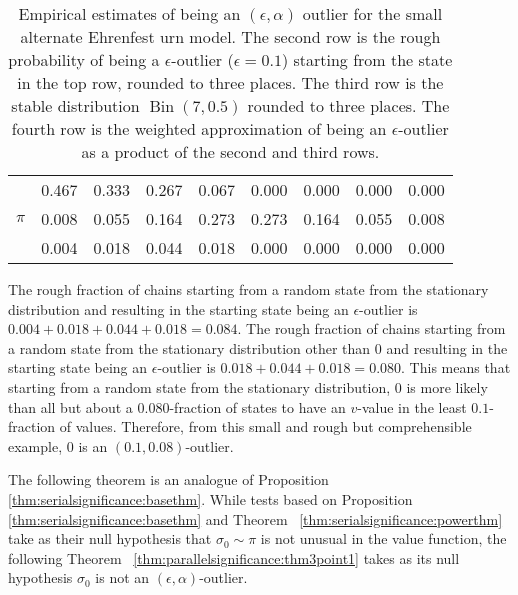 \documentclass[12pt]{article}
\begin{document}
\begin{example}
\begin{table}
\begin{tabular}{l|cccccccc}
                                                    & 0.467 & 0.333 & 0.267 & 0.067 & 0.000  & 0.000 & 0.000 & 0.000 \\ 
            \( \pi \)                               & 0.008 & 0.055 & 0.164 & 0.273 & 0.273  & 0.164 & 0.055 & 0.008 \\ 
                                                    & 0.004 & 0.018 & 0.044 & 0.018 & 0.000  & 0.000 & 0.000 & 0.000 \\ 
        \end{tabular}
        \caption{Empirical estimates of being an \( (\epsilon, \alpha) \)
        outlier for the small alternate Ehrenfest urn model.  The second
        row is the rough probability of being a \( \epsilon \)-outlier (\(
        \epsilon = 0.1 \)) starting from the state in the top row,
        rounded to three places. The third row is the stable
        distribution \(
        \operatorname{Bin}
        (7, 0.5) \) rounded to three places.  The fourth row is the
        weighted approximation of being an \( \epsilon \)-outlier as a
        product of the second and third rows.  }%
        \label{tab:parallelsignificance:epsalpha}
    \end{table}

    The rough fraction of chains starting from a random state from the
    stationary distribution and resulting in the starting state being an
    \( \epsilon \)-outlier is \( 0.004 + 0.018 + 0.044 + 0.018 = 0.084 \).
    The rough fraction of chains starting from a random state from the
    stationary distribution other than \( 0 \) and resulting in the
    starting state being an \( \epsilon \)-outlier is \( 0.018 + 0.044 +
    0.018 = 0.080 \).  This means that starting from a random state from
    the stationary distribution, \( 0 \) is more likely than all but
    about a \( 0.080 \)-fraction of states to have an \( v \)-value in
    the least \( 0.1 \)-fraction of values.  Therefore, from this small
    and rough but comprehensible example, \( 0 \) is an \( (0.1, 0.08) \)-outlier.

\end{example}

The following theorem is an analogue of Proposition~%
\ref{thm:serialsignificance:basethm}. While tests based on Proposition~%
\ref{thm:serialsignificance:basethm} and Theorem~%
\ref{thm:serialsignificance:powerthm} take as their null hypothesis that
\( \sigma_0 \sim \pi \) is not unusual in the value function, the
following Theorem~%
\ref{thm:parallelsignificance:thm3point1} takes as its null hypothesis \(
\sigma_{0} \) is not an \( (\epsilon, \alpha) \)-outlier.
\end{document}
